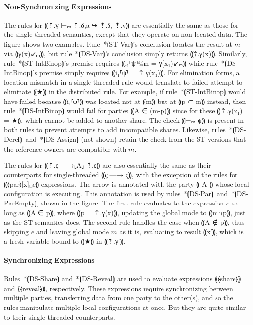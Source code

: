 \paragraph*{Non-Synchronizing Expressions}
%
The rules for ⸨⇡.γ ⊢ₘ ⇡.δ,a ↪ ⇡.δ, ⇡.v⸩ are essentially the same as
those for the single-threaded semantics, except that they operate on
non-located data. The figure shows two examples. Rule~*⦗ST-Var⦘'s
conclusion locates the
result at $m$ via ⸨γ(x)↙ₘ⸩, but rule~*⦗DS-Var⦘'s conclusion simply
returns ⸨⇡.γ(x)⸩. Similarly, rule~*⦗ST-IntBinop⦘'s premise requires
⸨i₁⸢ψ⸣@m = γ(x₁)↙ₘ⸩ while rule~*⦗DS-IntBinop⦘'s premise simply
requires ⸨i₁⸢ψ⸣ = ⇡.γ(x₁)⸩. For elimination forms, a location mismatch
in a single-threaded rule would translate to failed attempt to
eliminate ⸨★⸩ in the distributed rule. For example, if rule~*⦗ST-IntBinop⦘
would have failed because ⸨i₁⸢ψ⸣⸩ was located not at ⸨m⸩ but at ⸨p ⊂
m⸩ instead, then rule~*⦗DS-IntBinop⦘ would fail for parties ⸨A ∈ (m-p)⸩
since for these ⸨⇡.γ(x₁) = ★⸩, which cannot be added to another
share. The check ⸨⊢ₘ ψ⸩ is present in both rules to prevent attempts
to add incompatible shares. Likewise,
rules~*⦗DS-Deref⦘~and~*⦗DS-Assign⦘ (not shown) retain the check from the ST
versions that the reference owners are compatible with $m$.

The rules for ⸨⇡.ς —→⸤A⸥ ⇡.ς⸩ are also essentially the same as their
counterparts for single-threaded ⸨ς —→ ς⸩, with the exception of the rules for
⸨⦑par⦒[x]␣e⸩ expressions. The arrow is annotated with the party ⸨ A ⸩
whose local configuration is executing. This annotation is used by
rules~*⦗DS-Par⦘~and~*⦗DS-ParEmpty⦘, shown in the figure. The first rule evaluates to the
expression $e$ so long as ⸨A ∈ p⸩, where ⸨p = ⇡.γ(x)⸩, updating the
global mode to ⸨m∩p⸩, just as the ST semantics does. The second rule
handles the case when ⸨A ∉ p⸩, thus skipping $e$ and leaving global
mode $m$ as it is, evaluating to result ⸨x′⸩, which is a fresh
variable bound to ⸨★⸩ in ⸨⇡.γ′⸩.

\paragraph*{Synchronizing Expressions}
%
Rules~*⦗DS-Share⦘ and~*⦗DS-Reveal⦘ are used to evaluate expressions
⸨⦑share⦒⸩ and ⸨⦑reveal⦒⸩, respectively. These expressions require
synchronizing between multiple parties, transferring data from one
party to the other(s), and so the rules manipulate multiple local
configurations at once. But they are quite similar to their
single-threaded counterparts.

